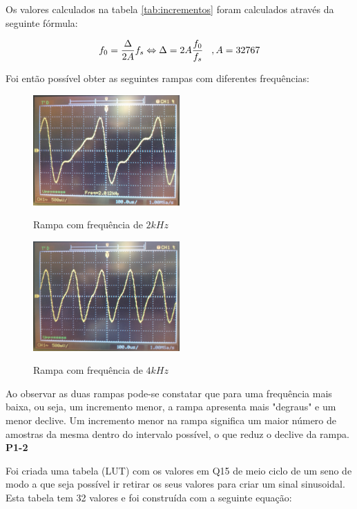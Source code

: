\documentclass[11pt]{article}
\begin{document}
Os valores calculados na tabela \ref{tab:incrementos} foram calculados através da seguinte fórmula:

\begin{equation}
 f_{0}= \frac{\Delta}{2A}f_{s} \Leftrightarrow \Delta= 2A\frac{f_{0}}{f_{s}} \hspace{3 mm}, A=32767
\end{equation}

Foi então possível obter as seguintes rampas com diferentes frequências:


\begin{figure}[H]
	\centering
	\includegraphics[width=0.5\textwidth]{./P1_2kHz}~\\
	\caption{Rampa com frequência de $ 2 kHz $}
\end{figure}


\begin{figure}[H]
	\centering
	\includegraphics[width=0.5\textwidth]{./P1_4kHz}~\\
	\caption{Rampa com frequência de $ 4 kHz $}
\end{figure}
Ao observar as duas rampas pode-se constatar que para uma frequência mais baixa, ou seja, um incremento menor, a rampa apresenta mais "degraus" e um menor declive. Um incremento menor na rampa significa um maior número de amostras da mesma dentro do intervalo possível, o que reduz o declive da rampa.
\vspace{2 mm}
\textbf{P1-2}
\label{para:P1-2}

Foi criada uma tabela (LUT) com os valores em Q15 de meio ciclo de um seno de modo a que seja possível ir retirar os seus valores para criar um sinal sinusoidal. Esta tabela tem 32 valores e foi construída com a seguinte equação:
\end{document}
